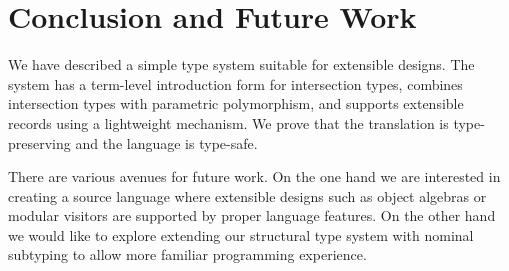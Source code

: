 \section{Conclusion and Future Work}

We have described a simple type system suitable for extensible designs.
The system has a term-level introduction form for intersection types, combines intersection types with
parametric polymorphism, and supports extensible records using a lightweight
mechanism. We prove that the translation is type-preserving and the language is
type-safe.

There are various avenues for future work. On the one hand we are
interested in creating a source language where extensible designs such as object
algebras or modular visitors are supported by proper language features. On the
other hand we would like to explore extending our structural type system with
nominal subtyping to allow more familiar programming experience.
